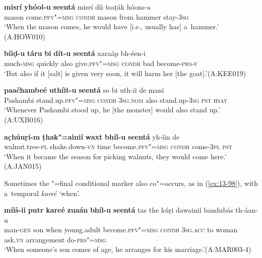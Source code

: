 \begin{exe}
\ex
\label{ex:13-94}
\gll \textbf{misrí} \textbf{yhóol-u} \textbf{seentá} misrí díi tsaṭák hóons-a \\
mason come.\textsc{pfv"=msg} \textsc{condh} mason from hammer stay-\textsc{3sg}  \\
\glt `When the mason comes, he would have [i.e., usually has] a~hammer.' (A:HOW010)

\ex
\label{ex:13-95}
\gll \textbf{bíiḍ-u} \textbf{táru} \textbf{bi} \textbf{dít-u} \textbf{seentá} xaraáp  bh-éen-i \\
much-\textsc{msg} quickly also give.\textsc{pfv"=msg} \textsc{condh} bad  become-\textsc{prs-f}   \\
\glt `But also if it [salt] is given very soon, it will harm her [the goat].'\newline (A:KEE019)

\ex
\label{ex:13-96}
\gll \textbf{paačhambeé} \textbf{uthíit-u} \textbf{seentá} so bi  uth-íi de maní \\
Pashambi stand.up.\textsc{pfv"=msg} \textsc{condh} \textsc{3sg.nom} also stand.up-\textsc{3sg} \textsc{pst} \textsc{hsay}  \\
\glt `Whenever Pashambi stood up, he [the monster] would also stand up.' (A:UXB016)

\ex
\label{ex:13-97}
\gll \textbf{ac̣húuṛi-m} \textbf{ṭhak"=ainií} \textbf{waxt} \textbf{bhíl-u} \textbf{seentá}  yh-íin de \\
walnut.tree-\textsc{pl} shake.down-\textsc{vn} time become.\textsc{pfv"=msg} \textsc{condh} come-\textsc{3pl} \textsc{ pst}    \\
\glt `When it became the season for picking walnuts, they would come here.' (A:JAN015) 
\end{exe}

Sometimes the "=final conditional marker also co"=occurs, as in (\ref{ex:13-98}), with a~temporal  \textit{kareé} `when'. 

\begin{exe}
\ex
\label{ex:13-98}
\gll \textbf{míiš-ii} \textbf{putr} \textbf{kareé} \textbf{zuaán} \textbf{bhíl-u} \textbf{seentá} tas the kúṛi dawainií bandubás th-áan-u\\
man-\textsc{gen} son when young.adult become.\textsc{pfv"=msg} \textsc{condh} \textsc{3sg.acc} to woman ask.\textsc{vn} arrangement do-\textsc{prs"=msg}  \\
\glt `When someone's son comes of age, he arranges for his marriage.'\newline (A:MAR003-4) 
\end{exe}

